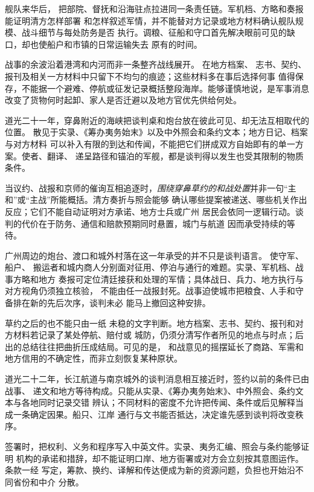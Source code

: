 舰队来华后，
把部院、督抚和沿海驻点拉进同一条责任链。军机档、方略和奏报能证明清方怎样部署
和怎样叙述军情，并不能替对方记录或地方材料确认舰队规模、战斗细节与每处防务是否
执行。调粮、征船和守口首先解决眼前可见的缺口，却也使船户和市镇的日常运输失去
原有的时间。

战事的余波沿着港湾和内河而非一条整齐战线展开。
在地方档案、
志书、契约、报刊及相关一方材料中只留下不均匀的痕迹；这些材料多在事后选择何事
值得保存，不能据一个避难、停航或征发记录概括整段海岸。能够谨慎地说，是军事消息
改变了货物何时起卸、家人是否迁避以及地方官优先供给何处。

道光二十一年，穿鼻附近的海峡把谈判桌和炮台放在彼此可见、却无法互相取代的位置。
散见于实录、《筹办夷务始末》以及中外照会和条约文本；地方日记、档案与对方材料
可以补入有限的到达和传闻，不能把它们拼成双方自始即有的单一方案。使者、翻译、
递呈路径和锚泊的军舰，都是谈判得以发生也受其限制的物质条件。

当议约、战报和京师的催询互相追逐时，\emph
{围绕穿鼻草约的和战处置}并非一句“主和”或“主战”所能概括。清方奏折与照会能够
确认哪些提案被递送、哪些机关作出反应；它们不能自动证明对方承诺、地方士兵或广州
居民会依同一逻辑行动。谈判的代价在于防务、通信和赔款预期同时悬置，城门与航道
因而承受持续的等待。

广州周边的炮台、渡口和城外村落在这一年承受的并不只是谈判语言。
使守军、船户、
搬运者和城内商人分别面对征用、停泊与通行的难题。实录、军机档、战事方略和地方
奏报可定位清廷接获和处理的军情；具体战日、兵力、地方执行与对方视角仍须独立核验，
不能由任一战报封死。战事迫使城市把粮食、人手和守备排在新的先后次序，谈判未必
能马上撤回这种安排。

草约之后的也不能只由一纸
未稳的文字判断。地方档案、志书、契约、报刊和对方材料若记录了某处停航、赔付或
城防，仍须分清写作者所见的地点与时点；后出的总结往往把曲折压成结局。可见的是，
和战意见的摇摆延长了商路、军需和地方信用的不确定性，而非立刻恢复某种原状。

道光二十二年，长江航道与南京城外的谈判消息相互接近时，签约以前的条件已由战事、
递文和地方等待构成。只能从实录、《筹办夷务始末》、中外照会、条约文本与各地同时记录交错
辨认；不同材料的密度不允许把传闻、条件或后见解释当成一条确定因果。船只、江岸
通行与文书能否抵达，决定谁先感到谈判将改变秩序。

签署时，把权利、义务和程序写入中英文件。实录、夷务汇编、照会与条约能够证明
机构的承诺和措辞，却不能证明口岸、地方衙署或对方会立刻按其意图运作。条款一经
写定，筹款、换约、译解和传达便成为新的资源问题，负担也开始沿不同省份和中介
分散。


